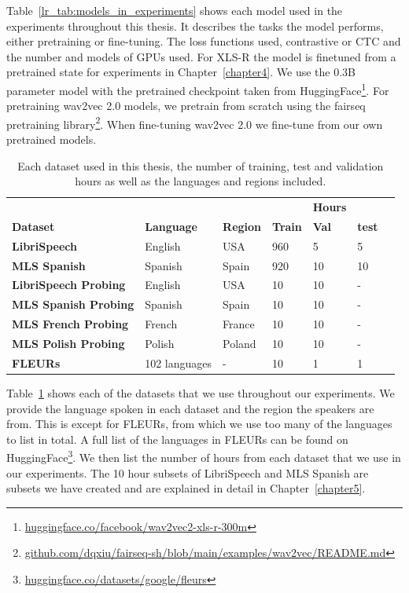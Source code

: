 Table~\ref{lr_tab:models_in_experiments} shows each model used in the experiments throughout this thesis. It describes the tasks the model performs, either pretraining or fine-tuning. The loss functions used, contrastive or CTC and the number and models of GPUs used. For XLS-R the model is finetuned from a pretrained state for experiments in Chapter~\ref{chapter4}. We use the 0.3B parameter model with the pretrained checkpoint taken from HuggingFace\footnote{\hyperlink{https://huggingface.co/facebook/wav2vec2-xls-r-300m}{huggingface.co/facebook/wav2vec2-xls-r-300m}}. For pretraining wav2vec 2.0 models, we pretrain from scratch using the fairseq pretraining library\footnote{\href{https://github.com/dqxiu/fairseq-sh/blob/main/examples/wav2vec/README.md}{github.com/dqxiu/fairseq-sh/blob/main/examples/wav2vec/README.md}}. When fine-tuning wav2vec 2.0 we fine-tune from our own pretrained models. 

\begin{table}[h]
\centering
\begin{tabular}{l|ll|llll}
\hline
 & & &  & \textbf{Hours} &   \\ 
\textbf{Dataset}        & \textbf{Language} & \textbf{Region} & \textbf{Train} &  \textbf{Val}   &  \textbf{test}  \\ \hline
\textbf{LibriSpeech} \cite{librispeech} & English & USA & 960  &  5 & 5 \\
\textbf{MLS Spanish} \cite{MLS} & Spanish & Spain & 920 &  10 & 10 \\
\textbf{LibriSpeech Probing} \cite{librispeech} & English & USA & 10 & 10 & -  \\
\textbf{MLS Spanish Probing} \cite{MLS} & Spanish & Spain & 10 & 10 & -  \\
\textbf{MLS French Probing} \cite{MLS} & French & France & 10 & 10 & - \\
\textbf{MLS Polish Probing} \cite{MLS} & Polish & Poland & 10 & 10 & - \\
\textbf{FLEURs} \cite{FLEURS} & 102 languages & - & 10   & 1 & 1 \\ \hline
\end{tabular}
\caption{Each dataset used in this thesis, the number of training, test and validation hours as well as the languages and regions included.}
\label{lr_tab:datasets_in_experiments}
\end{table}

Table~\ref{lr_tab:datasets_in_experiments} shows each of the datasets that we use throughout our experiments. We provide the language spoken in each dataset and the region the speakers are from. This is except for FLEURs, from which we use too many of the languages to list in total. A full list of the languages in FLEURs can be found on HuggingFace\footnote{\hyperlink{https://huggingface.co/datasets/google/fleurs}{huggingface.co/datasets/google/fleurs}}. We then list the number of hours from each dataset that we use in our experiments. The 10 hour subsets of LibriSpeech and MLS Spanish \cite{librispeech, MLS} are subsets we have created and are explained in detail in Chapter~\ref{chapter5}.

